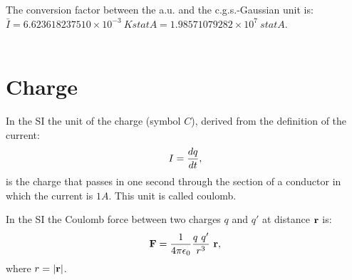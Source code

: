 \documentclass[12pt,a4paper]{article}
\def\bari{6.623618237510\times 10^{-3}}
\def\kappaa{1.000000000274\times 10^{-1}}
\def\baricgs{1.98571079282\times 10^{7}}
\begin{document}
%

{\color{green} The conversion factor between the a.u. and the c.g.s.-Gaussian 
unit is: $\bar I=\bari\ K statA=\baricgs\ statA$. \\
}
\\

\newpage
\section{\color{coral}Charge}
In the SI the unit of the charge (symbol $C$), derived from the definition 
of the current:
\begin{equation}
I={dq \over dt},
\label{current}
\end{equation}
is the charge that passes in one second through the section of a conductor
in which the current is $1 A$. This unit is called coulomb.

In the SI the Coulomb force between two charges $q$ and $q'$ at
distance ${\bf r}$ is:
\begin{equation}
{\bf F} = {1\over 4 \pi \epsilon_0} {q\ q' \over r^3}\ {\bf r},
\label{coulomb}
\end{equation}
where $r=|{\bf r}|$.
\\
\end{document}
